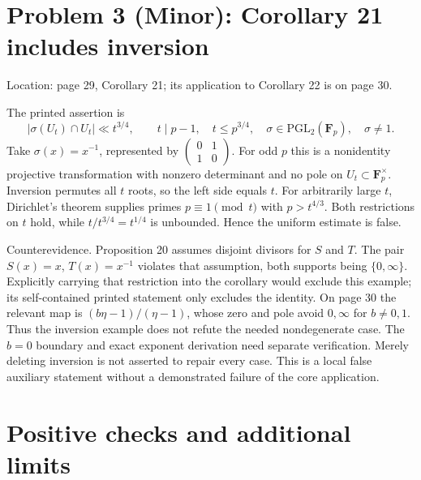\documentclass[10pt]{article}
\begin{document}
\section*{Problem 3 (Minor): Corollary 21 includes inversion}
Location: page 29, Corollary 21; its application to Corollary 22 is on page 30.\par
The printed assertion is \[|\sigma(U_t)\cap U_t|\ll t^{3/4},\qquad
t\mid p-1,\quad t\le p^{3/4},\quad
\sigma\in\mathrm{PGL}_2(\mathbf F_p),\quad \sigma\ne1.\] Take \(\sigma(x)=x^{-1}\), represented by \(\left(\begin{smallmatrix}0&1\\1&0\end{smallmatrix}\right)\). For odd \(p\) this is a nonidentity projective transformation with nonzero determinant and no pole on \(U_t\subset\mathbf F_p^\times\). Inversion permutes all \(t\) roots, so the left side equals \(t\). For arbitrarily large \(t\), Dirichlet’s theorem supplies primes \(p\equiv1\pmod t\) with \(p>t^{4/3}\). Both restrictions on \(t\) hold, while \(t/t^{3/4}=t^{1/4}\) is unbounded. Hence the uniform estimate is false.\par
Counterevidence. Proposition 20 assumes disjoint divisors for \(S\) and \(T\). The pair \(S(x)=x\), \(T(x)=x^{-1}\) violates that assumption, both supports being \(\{0,\infty\}\). Explicitly carrying that restriction into the corollary would exclude this example; its self-contained printed statement only excludes the identity. On page 30 the relevant map is \((b\eta-1)/(\eta-1)\), whose zero and pole avoid \(0,\infty\) for \(b\ne0,1\). Thus the inversion example does not refute the needed nondegenerate case. The \(b=0\) boundary and exact exponent derivation need separate verification. Merely deleting inversion is not asserted to repair every case. This is a local false auxiliary statement without a demonstrated failure of the core application.\par
\section*{Positive checks and additional limits}
\end{document}
